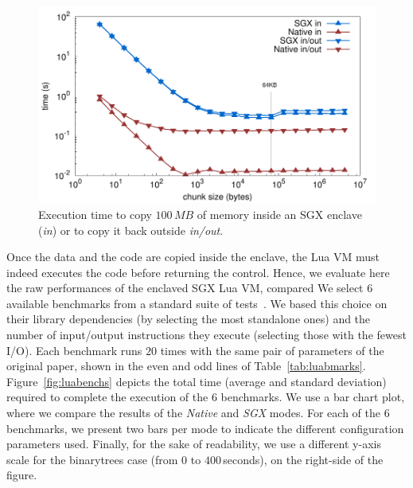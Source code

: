 \begin{figure}[t!]
  \centering
  \includegraphics[width=\linewidth]{plots/memcpy/memcpy}
  \caption{Execution time to copy $100\,MB$ of memory inside an SGX enclave (\emph{in}) or to copy it back outside {\emph{in/out}.} }
  \label{fig:sgxmemcpy}
\end{figure}

Once the data and the code are copied inside the enclave, the Lua VM must indeed executes the code before returning the control. 
Hence, we evaluate here the raw performances of the enclaved SGX Lua VM, compared 
We select $6$ available benchmarks from a standard suite of tests~\cite{bolz2015}.
We based this choice on their library dependencies (by selecting the most standalone ones) and the number of input/output instructions they execute (selecting those with the fewest I/O).
Each benchmark runs $20$ times with the same pair of parameters of the original paper, shown in the even and odd lines of Table~\ref{tab:luabmarks}.
Figure~\ref{fig:luabenchs} depicts the total time (average and standard deviation) required to complete the execution of the 6 benchmarks.
We use a bar chart plot, where we compare the results of the \emph{Native} and \emph{SGX} modes. 
For each of the $6$ benchmarks, we present two bars per mode to indicate the different configuration parameters used.
Finally, for the sake of readability, we use a different y-axis scale for the \textsf{binarytrees} case (from $0$ to $400$\,seconds), on the right-side of the figure.

